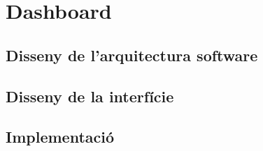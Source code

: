 
\chapter{Dashboard} %

\label{DissenyDashboard} %


\section{Disseny de l'arquitectura software}

\section{Disseny de la interfície}

\section{Implementació}